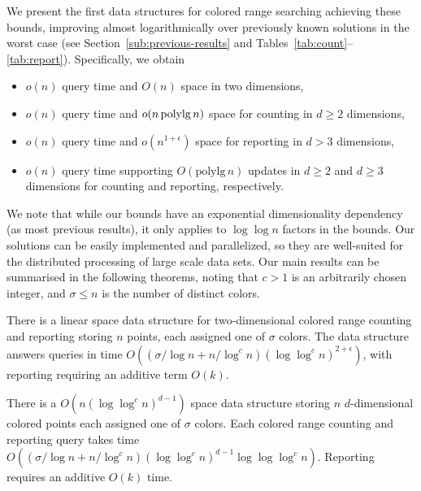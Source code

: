 We present the first data structures for colored range searching achieving these bounds, improving almost logarithmically over previously known solutions in the worst case (see Section~\ref{sub:previous-results} and Tables~\ref{tab:count}--\ref{tab:report}). Specifically, we obtain
\begin{itemize}
    \item $o(n)$ query time and $O(n)$ space in two dimensions,
    \item $o(n)$ query time and $o(n \mathrm{\, polylg \,} n)$ space for counting in $d \geq 2$ dimensions,
    \item $o(n)$ query time and $o(n^{1+\epsilon})$ space for reporting in $d > 3$ dimensions,
    \item $o(n)$ query time supporting $O(\mathrm{polylg \,} n)$ updates in $d \geq 2$ and $d \geq 3$ dimensions for counting and reporting, respectively.
\end{itemize}


We note that while our bounds have an exponential dimensionality dependency (as most previous results), it only applies to $\log \log n$ factors in the bounds.
Our solutions can be easily implemented and parallelized, so they are well-suited for the distributed processing of large scale data sets. Our main results can be summarised in the following theorems, noting that $c > 1$ is an arbitrarily chosen integer, and $\sigma \leq n$ is the number of distinct colors.

\begin{theorem}\label{thm:2D}
    There is a linear space data structure for two-dimensional colored range counting and reporting storing $n$ points, each assigned one of $\sigma$ colors. The data structure answers queries in time $O( ( \sigma / \log n + n / \log ^c n ) (\log \log ^c n)^{2+\epsilon} )$, with reporting requiring an additive term $O(k)$.
\end{theorem}

\begin{theorem}\label{thm:dD}
  There is a $O(n (\log \log ^{c} n) ^{d-1})$ space data structure storing $n$ $d$-dimensional colored points each assigned one of $\sigma$ colors. Each colored range counting and reporting query takes time $O(( \sigma / \log n + n / \log ^c n ) (\log \log ^{c} n) ^{d-1} \log \log \log ^c n )$. Reporting requires an additive $O(k)$ time.
\end{theorem}

